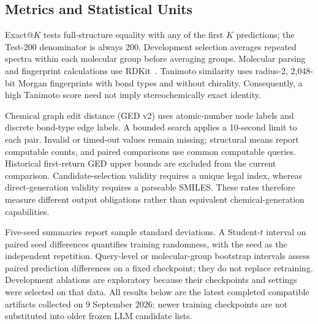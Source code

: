 \subsection{Metrics and Statistical Units}\label{sec:metrics}
Exact@$K$ tests full-structure equality with any of the first $K$ predictions; the Test-200 denominator is always 200. Development selection averages repeated spectra within each molecular group before averaging groups. Molecular parsing and fingerprint calculations use RDKit~\cite{landrum2013rdkit}. Tanimoto similarity uses radius-2, 2,048-bit Morgan fingerprints with bond types and without chirality. Consequently, a high Tanimoto score need not imply stereochemically exact identity.

Chemical graph edit distance (GED v2) uses atomic-number node labels and discrete bond-type edge labels. A bounded search applies a 10-second limit to each pair. Invalid or timed-out values remain missing; structural means report computable counts, and paired comparisons use common computable queries. Historical first-return GED upper bounds are excluded from the current comparison. Candidate-selection validity requires a unique legal index, whereas direct-generation validity requires a parseable SMILES. These rates therefore measure different output obligations rather than equivalent chemical-generation capabilities.

Five-seed summaries report sample standard deviations. A Student-$t$ interval on paired seed differences quantifies training randomness, with the seed as the independent repetition. Query-level or molecular-group bootstrap intervals assess paired prediction differences on a fixed checkpoint; they do not replace retraining. Development ablations are exploratory because their checkpoints and settings were selected on that data. All results below are the latest completed compatible artifacts collected on 9 September 2026; newer training checkpoints are not substituted into older frozen LLM candidate lists.

